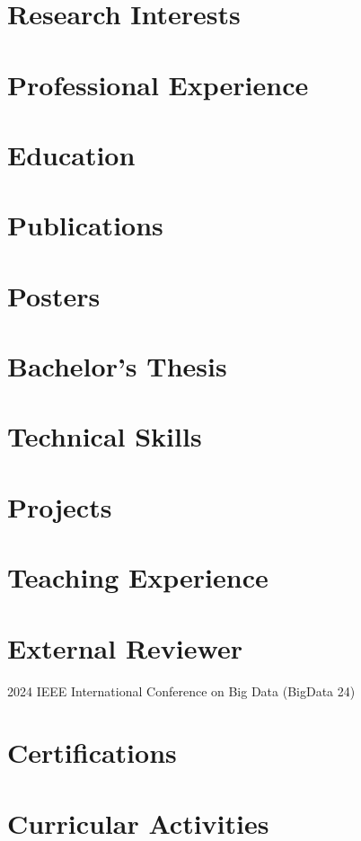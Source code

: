 \documentclass[10pt,a4paper,calibri]{moderncv}
\begin{document}
\makecvtitle{}
\vspace{-32pt}

\section{Research Interests}


\section{Professional Experience}


\section{Education}


\section{Publications}


\section{Posters}


\section{Bachelor's Thesis}


\section{Technical Skills}


\section{Projects}


\section{Teaching Experience}


\section{External Reviewer}
2024 IEEE International Conference on Big Data (BigData 24)

\section{Certifications}


\section{Curricular Activities}

\end{document}
